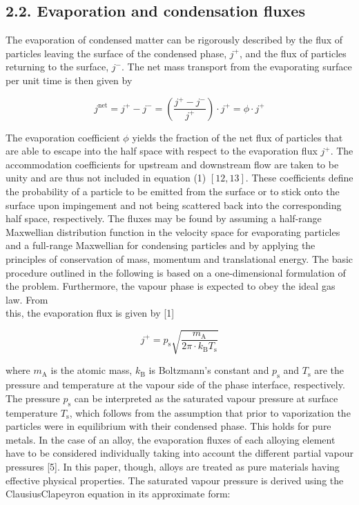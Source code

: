 \documentclass[10pt]{article}
\begin{document}
\subsection*{2.2. Evaporation and condensation fluxes}
The evaporation of condensed matter can be rigorously described by the flux of particles leaving the surface of the condensed phase, $j^{+}$, and the flux of particles returning to the surface, $j^{-}$. The net mass transport from the evaporating surface per unit time is then given by


\begin{equation*}
j^{\mathrm{net}}=j^{+}-j^{-}=\left(\frac{j^{+}-j^{-}}{j^{+}}\right) \cdot j^{+}=\phi \cdot j^{+} \tag{1}
\end{equation*}


The evaporation coefficient $\phi$ yields the fraction of the net flux of particles that are able to escape into the half space with respect to the evaporation flux $j^{+}$. The accommodation coefficients for upstream and downstream flow are taken to be unity and are thus not included in equation (1) $[12,13]$. These coefficients define the probability of a particle to be emitted from the surface or to stick onto the surface upon impingement and not being scattered back into the corresponding half space, respectively. The fluxes may be found by assuming a half-range Maxwellian distribution function in the velocity space for evaporating particles and a full-range Maxwellian for condensing particles and by applying the principles of conservation of mass, momentum and translational energy. The basic procedure outlined in the following is based on a one-dimensional formulation of the problem. Furthermore, the vapour phase is expected to obey the ideal gas law. From\\
this, the evaporation flux is given by [1]


\begin{equation*}
j^{+}=p_{\mathrm{s}} \sqrt{\frac{m_{\mathrm{A}}}{2 \pi \cdot k_{\mathrm{B}} T_{\mathrm{s}}}} \tag{2}
\end{equation*}


where $m_{\mathrm{A}}$ is the atomic mass, $k_{\mathrm{B}}$ is Boltzmann's constant and $p_{\mathrm{s}}$ and $T_{\mathrm{s}}$ are the pressure and temperature at the vapour side of the phase interface, respectively. The pressure $p_{\mathrm{s}}$ can be interpreted as the saturated vapour pressure at surface temperature $T_{\mathrm{s}}$, which follows from the assumption that prior to vaporization the particles were in equilibrium with their condensed phase. This holds for pure metals. In the case of an alloy, the evaporation fluxes of each alloying element have to be considered individually taking into account the different partial vapour pressures [5]. In this paper, though, alloys are treated as pure materials having effective physical properties. The saturated vapour pressure is derived using the ClausiusClapeyron equation in its approximate form:
\end{document}
